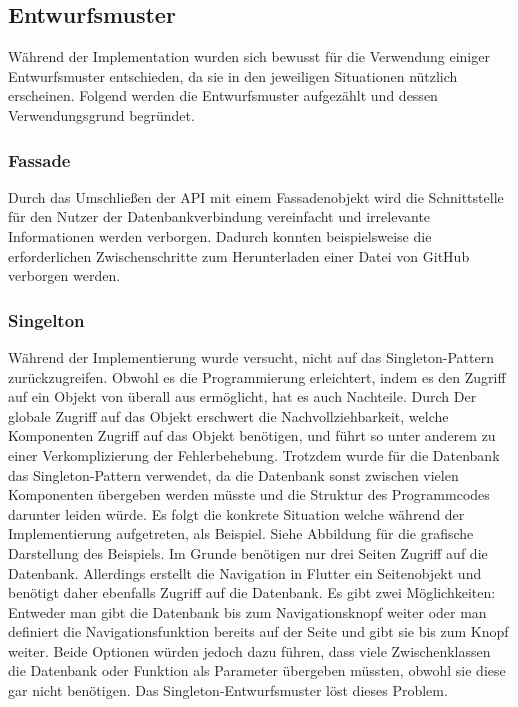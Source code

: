\subsection{Entwurfsmuster}%
Während der Implementation wurden sich bewusst für die Verwendung einiger Entwurfsmuster entschieden, da sie in den jeweiligen Situationen nützlich erscheinen. %
Folgend werden die Entwurfsmuster aufgezählt und dessen Verwendungsgrund begründet.%
%
%
%
%
%
%
%
%
%
%
\subsubsection{Fassade}
Durch das Umschließen der API mit einem Fassadenobjekt wird die Schnittstelle für den Nutzer der Datenbankverbindung vereinfacht und irrelevante Informationen werden verborgen. Dadurch konnten beispielsweise die erforderlichen Zwischenschritte zum Herunterladen einer Datei von GitHub verborgen werden.
%
%
%
%
%
%
\subsubsection{Singelton}%
Während der Implementierung wurde versucht, nicht auf das Singleton-Pattern zurückzugreifen. 
	Obwohl es die Programmierung erleichtert, indem es den Zugriff auf ein Objekt von überall aus ermöglicht, hat es auch Nachteile. %
	Durch Der globale Zugriff auf das Objekt erschwert die Nachvollziehbarkeit, welche Komponenten Zugriff auf das Objekt benötigen, und führt so unter anderem zu einer Verkomplizierung der Fehlerbehebung. %
Trotzdem wurde für die Datenbank das Singleton-Pattern verwendet, da die Datenbank sonst zwischen vielen Komponenten übergeben werden müsste und die Struktur des Programmcodes darunter leiden würde.\newline%
Es folgt die konkrete Situation welche während der Implementierung aufgetreten, als Beispiel. Siehe Abbildung  für die grafische Darstellung des Beispiels. Im Grunde benötigen nur drei Seiten Zugriff auf die Datenbank. Allerdings erstellt die Navigation in Flutter ein Seitenobjekt und benötigt daher ebenfalls Zugriff auf die Datenbank. Es gibt zwei Möglichkeiten: Entweder man gibt die Datenbank bis zum Navigationsknopf weiter oder man definiert die Navigationsfunktion bereits auf der Seite und gibt sie bis zum Knopf weiter. Beide Optionen würden jedoch dazu führen, dass viele Zwischenklassen die Datenbank oder Funktion als Parameter übergeben müssten, obwohl sie diese gar nicht benötigen. Das Singleton-Entwurfsmuster löst dieses Problem.
%
%
%
%
%
